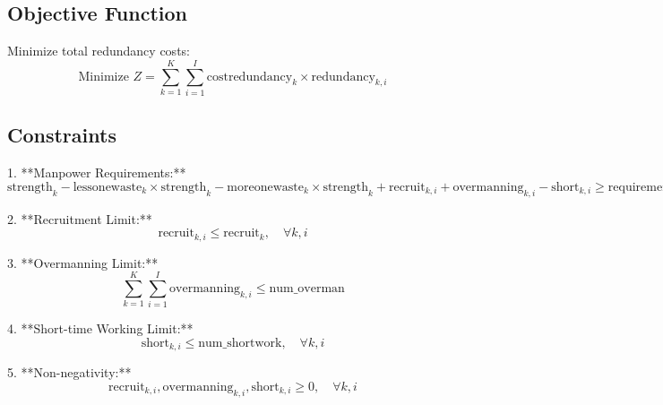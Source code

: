 \documentclass{article}
\begin{document}
\subsection*{Objective Function}
Minimize total redundancy costs:
\[
\text{Minimize } Z = \sum_{k=1}^{K} \sum_{i=1}^{I} \text{costredundancy}_{k} \times \text{redundancy}_{k,i}
\]

\subsection*{Constraints}
1. **Manpower Requirements:**
\[
\text{strength}_{k} - \text{lessonewaste}_{k} \times \text{strength}_{k} - \text{moreonewaste}_{k} \times \text{strength}_{k} + \text{recruit}_{k,i} + \text{overmanning}_{k,i} - \text{short}_{k,i} \geq \text{requirement}_{k,i}, \quad \forall k, i
\]

2. **Recruitment Limit:**
\[
\text{recruit}_{k,i} \leq \text{recruit}_{k}, \quad \forall k, i
\]

3. **Overmanning Limit:**
\[
\sum_{k=1}^{K} \sum_{i=1}^{I} \text{overmanning}_{k,i} \leq \text{num\_overman}
\]

4. **Short-time Working Limit:**
\[
\text{short}_{k,i} \leq \text{num\_shortwork}, \quad \forall k, i
\]

5. **Non-negativity:**
\[
\text{recruit}_{k,i}, \text{overmanning}_{k,i}, \text{short}_{k,i} \geq 0, \quad \forall k, i
\]
\end{document}
